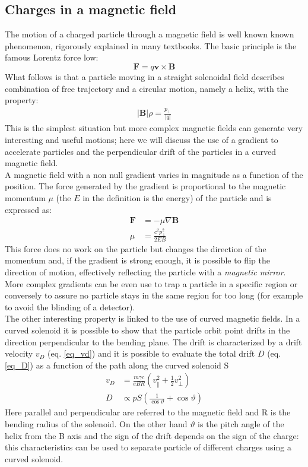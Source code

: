 \documentclass[12pt,a4paper,openright, oneside, titlepage]{book} %
\begin{document}
\subsection{Charges in a magnetic field}
\label{magnets}
The motion of a charged particle through a magnetic field is well known known phenomenon, rigorously explained in many textbooks. The basic principle is the famous Lorentz force low:
$$\textbf{F}=q\textbf{v}\times\textbf{B}$$
What follows is that a particle moving in a straight solenoidal field describes combination of free trajectory and a circular motion, namely a helix, with the property:
\begin{align}
|\textbf{B}|\rho = \frac{p_\perp}{|q|} 
\label{eq_brho}
\end{align}
This is the simplest situation but more complex magnetic fields can generate very interesting and useful motions; here we will discuss the use of a gradient to accelerate particles and the perpendicular drift of the particles in a curved magnetic field.\\
A magnetic field with a non null gradient varies in magnitude as a function of the position. The force generated by the gradient is proportional to the magnetic momentum $\mu$ (the $E$ in the definition is the energy) of the particle and is expressed as:
\begin{align}
\textbf{F} &= -\mu \nabla \textbf{B} \\
\mu &= \frac{c^2 p_\perp^2}{2EB}
\end{align}
This force does no work on the particle but changes the direction of the momentum and, if the gradient is strong enough, it is possible to flip the direction of motion, effectively reflecting the particle with a \textit{magnetic mirror}. More complex gradients can be even use to trap a particle in a specific region or conversely to assure no particle stays in the same region for too long (for example to avoid the blinding of a detector).\\
The other interesting property is linked to the use of curved magnetic fields. In a curved solenoid it is possible to show that the particle orbit point drifts in the direction perpendicular to the bending plane. The drift is characterized by a drift velocity $v_D$ (eq. \ref{eq_vd}) and it is possible to evaluate the total drift $D$ (eq. \ref{eq_D}) as a function of the path along the curved solenoid S
\begin{align}
v_D&=\frac{m\gamma c}{eBR}\left(v^2_\parallel+\frac{1}{2}v^2_\perp\right) \label{eq_vd}  \\
D&\propto pS\left(\frac{1}{\cos \vartheta}  + \cos \vartheta \right) \label{eq_D}
\end{align}
Here parallel and perpendicular are referred to the magnetic field and R is the bending radius of the solenoid. On the other hand $\vartheta$ is the pitch angle of the helix from the B axis and the sign of the drift depends on the sign of the charge: this characteristics can be used to separate particle of different charges using a curved solenoid.
\end{document}

